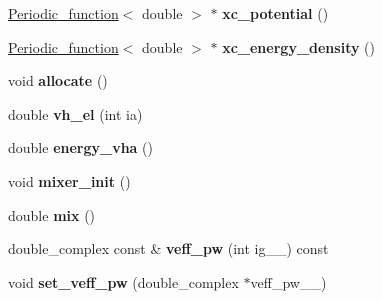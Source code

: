 \begin{DoxyCompactItemize}
\item 
\hypertarget{classsirius_1_1_potential_a74e9cc35a382cbc46e3a6785510116c7}{}\hyperlink{classsirius_1_1_periodic__function}{Periodic\+\_\+function}$<$ double $>$ $\ast$ {\bfseries xc\+\_\+potential} ()\label{classsirius_1_1_potential_a74e9cc35a382cbc46e3a6785510116c7}

\item 
\hypertarget{classsirius_1_1_potential_ac536b306a32fe14ebdbb90bfe62684dc}{}\hyperlink{classsirius_1_1_periodic__function}{Periodic\+\_\+function}$<$ double $>$ $\ast$ {\bfseries xc\+\_\+energy\+\_\+density} ()\label{classsirius_1_1_potential_ac536b306a32fe14ebdbb90bfe62684dc}

\item 
\hypertarget{classsirius_1_1_potential_a777819dae8634b13a2fb428d9591a72a}{}void {\bfseries allocate} ()\label{classsirius_1_1_potential_a777819dae8634b13a2fb428d9591a72a}

\item 
\hypertarget{classsirius_1_1_potential_ab873eb099e9c93512827085e851f5108}{}double {\bfseries vh\+\_\+el} (int ia)\label{classsirius_1_1_potential_ab873eb099e9c93512827085e851f5108}

\item 
\hypertarget{classsirius_1_1_potential_a578e355eab53f1d5ff56cffbd01a14b6}{}double {\bfseries energy\+\_\+vha} ()\label{classsirius_1_1_potential_a578e355eab53f1d5ff56cffbd01a14b6}

\item 
\hypertarget{classsirius_1_1_potential_a482cc560311a0348c2e9bfd8a82d19a1}{}void {\bfseries mixer\+\_\+init} ()\label{classsirius_1_1_potential_a482cc560311a0348c2e9bfd8a82d19a1}

\item 
\hypertarget{classsirius_1_1_potential_a0f1e857853010be663c403737ff9fbb1}{}double {\bfseries mix} ()\label{classsirius_1_1_potential_a0f1e857853010be663c403737ff9fbb1}

\item 
\hypertarget{classsirius_1_1_potential_af81314dcc38d837764cec2d41aaf0cab}{}double\+\_\+complex const \& {\bfseries veff\+\_\+pw} (int ig\+\_\+\+\_\+) const \label{classsirius_1_1_potential_af81314dcc38d837764cec2d41aaf0cab}

\item 
\hypertarget{classsirius_1_1_potential_a6a2a2223620919200acdcd849d0dce3b}{}void {\bfseries set\+\_\+veff\+\_\+pw} (double\+\_\+complex $\ast$veff\+\_\+pw\+\_\+\+\_\+)\label{classsirius_1_1_potential_a6a2a2223620919200acdcd849d0dce3b}


\end{DoxyCompactItemize}
